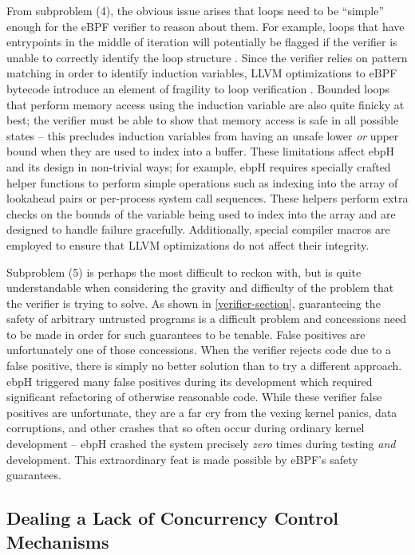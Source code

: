 \documentclass[
  12pt]{findlay}
\begin{document}
From subproblem (4), the obvious issue arises that loops need to be
``simple'' enough for the eBPF verifier to reason about them. For
example, loops that have entrypoints in the middle of iteration will
potentially be flagged if the verifier is unable to correctly identify
the loop structure \autocite{corbet18}. Since the verifier relies on
pattern matching in order to identify induction variables, LLVM
optimizations to eBPF bytecode introduce an element of fragility to loop
verification \autocite{corbet18}. Bounded loops that perform memory
access using the induction variable are also quite finicky at best; the
verifier must be able to show that memory access is safe in all possible
states -- this precludes induction variables from having an unsafe lower
\emph{or} upper bound when they are used to index into a buffer. These
limitations affect ebpH and its design in non-trivial ways; for example,
ebpH requires specially crafted helper functions to perform simple
operations such as indexing into the array of lookahead pairs or
per-process system call sequences. These helpers perform extra checks on
the bounds of the variable being used to index into the array and are
designed to handle failure gracefully. Additionally, special compiler
macros are employed to ensure that LLVM optimizations do not affect
their integrity.

Subproblem (5) is perhaps the most difficult to reckon with, but is
quite understandable when considering the gravity and difficulty of the
problem that the verifier is trying to solve. As shown in
\autoref{verifier-section}, guaranteeing the safety of arbitrary
untrusted programs is a difficult problem and concessions need to be
made in order for such guarantees to be tenable. False positives are
unfortunately one of those concessions. When the verifier rejects code
due to a false positive, there is simply no better solution than to try
a different approach. ebpH triggered many false positives during its
development which required significant refactoring of otherwise
reasonable code. While these verifier false positives are unfortunate,
they are a far cry from the vexing kernel panics, data corruptions, and
other crashes that so often occur during ordinary kernel development --
ebpH crashed the system precisely \emph{zero} times during testing
\emph{and} development. This extraordinary feat is made possible by
eBPF's safety guarantees.

\hypertarget{dealing-a-lack-of-concurrency-control-mechanisms}{%
\subsection{Dealing a Lack of Concurrency Control
Mechanisms}\label{dealing-a-lack-of-concurrency-control-mechanisms}}
\end{document}
